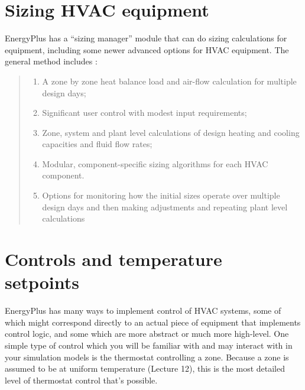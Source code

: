 \documentclass[10pt]{article}
\begin{document}


\section{Sizing HVAC equipment}

EnergyPlus has a ``sizing manager'' module that can do sizing calculations for equipment, including some newer advanced options for HVAC equipment. The general method includes \cite{EPdocs9engineering}:

\begin{quote}
\begin{enumerate}
    \item A zone by zone heat balance load and air-flow calculation for multiple design days;
    \item Significant user control with modest input requirements;
    \item Zone, system and plant level calculations of design heating and cooling capacities and fluid
flow rates;
\item Modular, component-specific sizing algorithms for each HVAC component.
\item Options for monitoring how the initial sizes operate over multiple design days and then making
adjustments and repeating plant level calculations
\end{enumerate}
\end{quote}

\section{Controls and temperature setpoints}

EnergyPlus has many ways to implement control of HVAC systems, some of which might correspond directly to an actual piece of equipment that implements control logic, and some which are more abstract or much more high-level. One simple type of control which you will be familiar with and may interact with in your simulation models is the thermostat controlling a zone. Because a zone is assumed to be at uniform temperature (Lecture 12), this is the most detailed level of thermostat control that's possible. 
\end{document}
